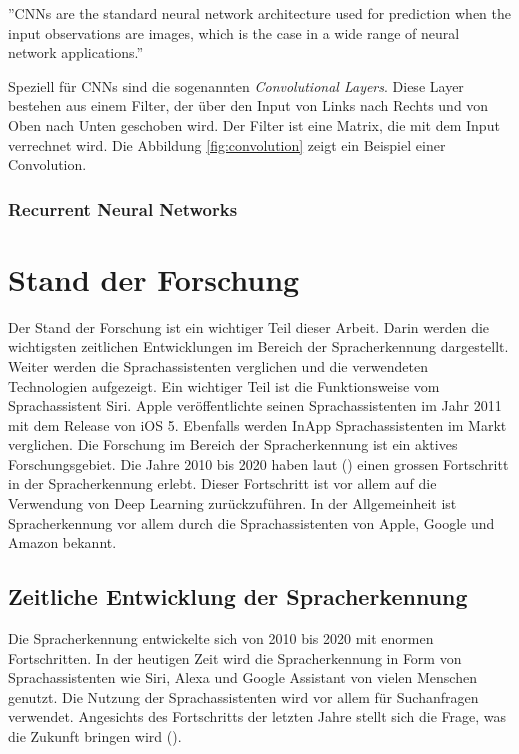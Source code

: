 \documentclass[11pt,a4paper]{article}
\begin{document}
\begin{displayquote}
	''CNNs are the standard neural network architecture used for prediction when the input 
	observations are images, which is the case in a wide range of neural network applications.''
\end{displayquote}

\noindent
Speziell für CNNs sind die sogenannten \textit{Convolutional Layers}. Diese Layer bestehen aus
einem Filter, der über den Input von Links nach Rechts und von Oben nach Unten geschoben wird. 
Der Filter ist eine Matrix, die mit dem Input verrechnet wird. Die Abbildung \ref{fig:convolution} 
zeigt ein Beispiel einer Convolution.




\subsubsection{Recurrent Neural Networks}


\newpage \section{Stand der Forschung}
Der Stand der Forschung ist ein wichtiger Teil dieser Arbeit. Darin werden die wichtigsten 
zeitlichen Entwicklungen im Bereich der Spracherkennung dargestellt. Weiter werden die 
Sprachassistenten verglichen und die verwendeten Technologien aufgezeigt. Ein wichtiger Teil ist
die Funktionsweise vom Sprachassistent Siri. Apple veröffentlichte seinen Sprachassistenten 
im Jahr 2011 mit dem Release von iOS 5. Ebenfalls werden InApp Sprachassistenten im
Markt verglichen. Die Forschung im Bereich der Spracherkennung ist ein aktives Forschungsgebiet. 
Die Jahre 2010 bis 2020 haben laut (\cite{hannun2021history}) einen grossen Fortschritt in der 
Spracherkennung erlebt. Dieser Fortschritt ist vor allem auf die Verwendung von Deep Learning 
zurückzuführen. In der Allgemeinheit ist Spracherkennung vor allem durch die Sprachassistenten von 
Apple, Google und Amazon bekannt. 


\subsection{Zeitliche Entwicklung der Spracherkennung} 
Die Spracherkennung entwickelte sich von 2010 bis 2020 mit enormen Fortschritten. In der heutigen
Zeit wird die Spracherkennung in Form von Sprachassistenten wie Siri, Alexa und Google Assistant von
vielen Menschen genutzt. Die Nutzung der Sprachassistenten wird vor allem für Suchanfragen 
verwendet. Angesichts des Fortschritts der letzten Jahre stellt sich die Frage, was die Zukunft
bringen wird (\cite{hannun2021history}).
\end{document}
